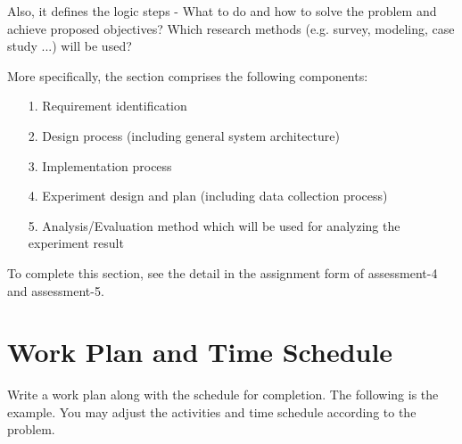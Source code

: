 \documentclass{ittelkom}
\begin{document}
Also, it defines the logic steps - What to do and how to solve the problem and achieve proposed objectives? Which research methods (e.g. survey, modeling, case study ...) will be used? 

More specifically, the section comprises the following components:
\begin{itemize}
\item[1.] Requirement identification
\item[2.] Design process (including general system architecture)
\item[3.] Implementation process
\item[4.] Experiment design and plan (including data collection process)
\item[5.] Analysis/Evaluation method which will be used for analyzing the experiment result
\end{itemize}

To complete this section, see the detail in the assignment form of assessment-4 and assessment-5.

\section{Work Plan and Time Schedule}
Write a work plan along with the schedule for completion. The following is the example. You may adjust the activities  and time schedule according to the problem.
\newline
\end{document}

